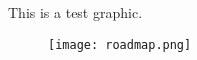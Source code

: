 \documentclass{report}
\begin{document}
This is a test graphic.

\begin{figure}[h!]
\texttt{[image: roadmap.png]}
\end{figure}
\end{document}
